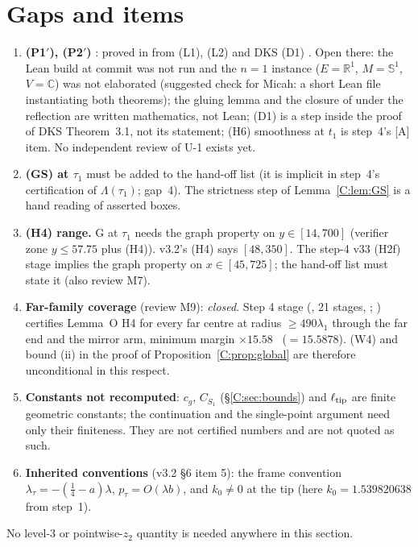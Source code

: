 \documentclass[11pt]{article}
\begin{document}
\section{Gaps and items}\label{C:sec:gaps}
\begin{enumerate}[leftmargin=*]
\item \textbf{(P1$'$), (P2$'$)} \tH: proved in  from (L1), (L2) \cite{CWFlow} and DKS (D1) \cite{DKS2002}. Open there: the Lean build at commit  was not run and the $n=1$ instance ($E=\mathbb R^1$, $M=\mathbb S^1$, $V=\mathbb C$) was not elaborated (suggested check for Micah: a short Lean file instantiating both theorems); the gluing lemma and the closure of  under the reflection are written mathematics, not Lean; (D1) is a step inside the proof of DKS Theorem~3.1, not its statement; (H6) smoothness at $t_1$ is step~4's [A] item. No independent review of U-1 exists yet.
\item \textbf{(GS) at $\tau_1$} must be added to the hand-off list (it is implicit in step~4's certification of $\Lambda(\tau_1)$;  gap~4). The strictness step of Lemma~\ref{C:lem:GS} is a hand reading of asserted boxes.
\item \textbf{(H4) range.} G at $\tau_1$ needs the graph property on $y\in[14,700]$ (verifier zone $y\le57.75$ plus (H4)). v3.2's (H4) says $[48,350]$. The step-4 v33 (H2f) stage implies the graph property on $x\in[45,725]$; the hand-off list must state it (also review M7).
\item \textbf{Far-family coverage} (review M9): \emph{closed}. Step 4 stage  (, 21 stages, ; ) certifies Lemma~O H4 for every far centre at radius $\ge490\lambda_1$ through the far end and the mirror arm, minimum margin $\times15.58$ \tC\ ($=15.5878$). (W4) and bound (ii) in the proof of Proposition~\ref{C:prop:global} are therefore unconditional in this respect.
\item \textbf{Constants not recomputed}: $c_g$, $C_{S_1}$ (\S\ref{C:sec:bounds}) and $\ell_{\rm tip}$ are finite geometric constants; the continuation and the single-point argument need only their finiteness. They are not certified numbers and are not quoted as such.
\item \textbf{Inherited conventions} (v3.2 \S6 item 5): the frame convention $\lambda_\tau=-(\frac14-a)\lambda$, $p_\tau=O(\lambda b)$, and $k_0\ne0$ at the tip (here $k_0=1.539820638$ from step~1).
\end{enumerate}
No level-3 or pointwise-$z_2$ quantity is needed anywhere in this section.
\end{document}
